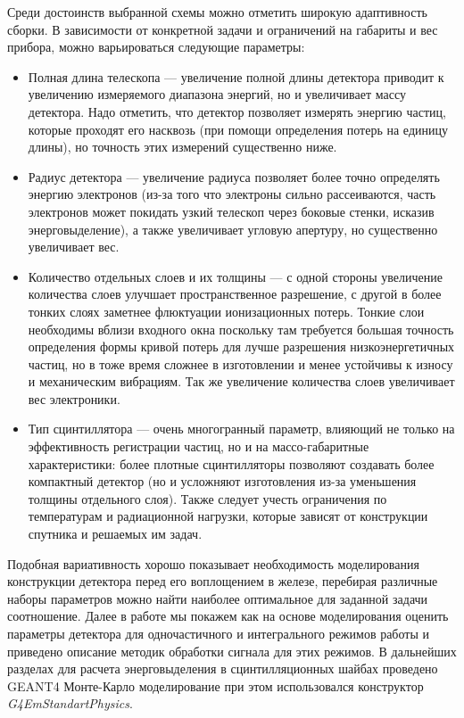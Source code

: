 Среди достоинств выбранной схемы можно отметить широкую адаптивность сборки. В зависимости от конкретной задачи и ограничений на габариты и вес прибора, можно варьироваться следующие параметры:
\begin{itemize}
    \item Полная длина телескопа --- увеличение полной длины детектора приводит к увеличению измеряемого диапазона энергий, но и увеличивает массу детектора. Надо отметить, что детектор позволяет измерять энергию частиц, которые проходят его насквозь (при помощи определения потерь на единицу длины), но точность этих измерений существенно ниже.
    \item Радиус детектора --- увеличение радиуса позволяет более точно определять энергию электронов (из-за того что электроны сильно рассеиваются, часть электронов может покидать узкий телескоп через боковые стенки, исказив энерговыделение), а также увеличивает угловую апертуру, но существенно увеличивает вес. 
    \item Количество отдельных слоев и их толщины --- с одной стороны увеличение количества слоев улучшает пространственное разрешение, с другой в более тонких слоях заметнее флюктуации ионизационных потерь. Тонкие слои необходимы вблизи входного окна поскольку там требуется большая точность определения формы кривой потерь для лучше разрешения низкоэнергетичных частиц, но в тоже время сложнее в изготовлении и менее устойчивы к износу и механическим вибрациям. Так же увеличение количества слоев увеличивает вес электроники.
    \item Тип сцинтиллятора --- очень многогранный параметр, влияющий не только на эффективность регистрации частиц, но и на массо-габаритные характеристики: более плотные сцинтилляторы позволяют создавать более компактный детектор (но и усложняют изготовления из-за уменьшения толщины отдельного слоя). Также следует учесть ограничения по температурам и радиационной нагрузки, которые зависят от конструкции спутника и решаемых им задач.
\end{itemize}
Подобная вариативность хорошо показывает необходимость моделирования конструкции детектора перед его воплощением в железе, перебирая различные наборы параметров можно найти наиболее оптимальное для заданной задачи соотношение. Далее в работе мы покажем как на основе моделирования оценить параметры детектора для одночастичного и интегрального режимов работы и приведено описание методик обработки сигнала для этих режимов. В дальнейших разделах для расчета энерговыделения в сцинтилляционных шайбах проведено GEANT4 Монте-Карло моделирование при этом  использовался конструктор \textit{G4EmStandartPhysics}.

